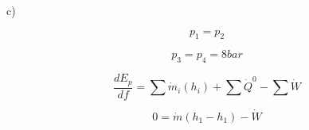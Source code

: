 c)

\[
p_1 = p_2
\]

\[
p_3 = p_4 = 8 bar
\]

\[
\frac{dE_{p}}{df} = \sum \dot{m}_i (h_i) + \sum \dot{Q}^0 - \sum \dot{W}
\]

\[
0 = \dot{m} (h_1 - h_1) - \dot{W}
\]